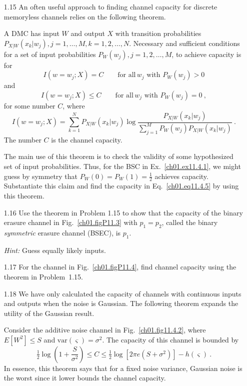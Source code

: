 \begin{itemize}
\item[1.15]
An often useful approach to finding channel capacity for
discrete memoryless channels relies on the following theorem.

\begin{theorem}
A DMC has input $W$ and output $X$ with transition probabilities
$P_{X|W} (x_k|w_j), j=1, \ldots, M, k=1,2,\ldots,N$.
Necessary and sufficient conditions for a set of input probabilities
$P_W(w_j), j = 1,2,\ldots,M$, to achieve capacity is for
$$
        I\left( w=w_j; X \right) = C
          \qquad \text{for all}\, w_j \, \, \text{with} \, \,
             P_W \left( w_j \right) > 0
$$
and
$$
        I\left( w=w_j; X \right) \leq C
          \qquad \text{for all}\, w_j \, \, \text{with} \, \,
             P_W \left( w_j \right) = 0~,
$$
for some number $C$, where
$$
\displaystyle
        I\left( w=w_j; X \right) =
                \sum_{k=1}^N P_{X|W} \left( x_k | w_j \right) \log
                \frac{P_{X|W} (x_k|w_j) }
                  {\sum_{j=1}^M P_W(w_j)P_{X|W} (x_k|w_j) }~.
$$
The number $C$ is the channel capacity.
\end{theorem}

The main use of this theorem is to check the validity of some
hypothesized set of input probabilities.
Thus, for the BSC in Ex.~\ref{ch01.ex11.4.1}, we might
guess by symmetry that $P_W (0) = P_W (1) = \tfrac{1}{2}$
achieves capacity.
Substantiate this claim and find the capacity in Eq.~\eqref{ch01.eq11.4.5}
by using this theorem.


\item[1.16]
Use the theorem in Problem 1.15 to show that the capacity of the binary
erasure channel in Fig.~\ref{ch01.figP11.3} with $p_1=p_2$,
called the binary \textit{symmetric} erasure channel (BSEC), is $p_1$.

\textit{Hint:} Guess equally likely inputs.


\item[1.17]
For the channel in Fig.~\ref{ch01.figP11.4}, find channel capacity
using the theorem in Problem~1.15.


\item[1.18]
We have only calculated the capacity of channels with continuous
inputs and outputs when the noise is Gaussian.
The following theorem expands the utility of the Gaussian result.

\begin{theorem}
Consider the additive noise channel in Fig.~\ref{ch01.fig11.4.2},
where $E[W^2] \leq S$ and $\text{var}(\varsigma) = \sigma^2 $.
The capacity of this channel is bounded by
$$
        \tfrac{1}{2} \log \left( 1 + \frac{S}{\sigma^2} \right)
         \leq C \leq \tfrac{1}{2} \log
          \left[ 2 \pi e \left( S+\sigma^2 \right) \right]
           - h(\varsigma)~.
$$
In essence, this theorem says that for a fixed noise variance,
Gaussian noise is the worst since it lower bounds the channel capacity.
\end{theorem}


\end{itemize}
